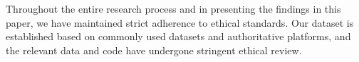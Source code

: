 Throughout the entire research process and in presenting the findings in this paper, we have maintained strict adherence to ethical standards. Our dataset is established based on commonly used datasets and authoritative platforms, and the relevant data and code have undergone stringent ethical review.
